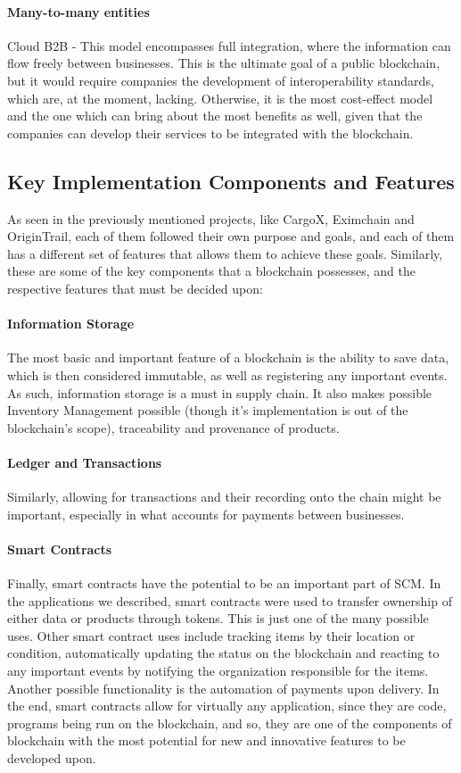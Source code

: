 \paragraph{Many-to-many entities} Cloud B2B - This model encompasses full integration, where the information can flow freely between businesses. This is the ultimate goal of a public blockchain, but it would require companies the development of interoperability standards, which are, at the moment, lacking. Otherwise, it is the most cost-effect model and the one which can bring about the most benefits as well, given that the companies can develop their services to be integrated with the blockchain.

\subsection{Key Implementation Components and Features}
As seen in the previously mentioned projects, like CargoX, Eximchain and OriginTrail, each of them followed their own purpose and goals, and each of them has a different set of features that allows them to achieve these goals. Similarly, these are some of the key components that a blockchain possesses, and the respective features that must be decided upon:

\paragraph{Information Storage}
The most basic and important feature of a blockchain is the ability to save data, which is then considered immutable, as well as registering any important events. As such, information storage is a must in supply chain. It also makes possible Inventory Management possible (though it's implementation is out of the blockchain's scope), traceability and provenance of products.
      
\paragraph{Ledger and Transactions}
Similarly, allowing for transactions and their recording onto the chain might be important, especially in what accounts for payments between businesses.
  
\paragraph{Smart Contracts}
Finally, smart contracts have the potential to be an important part of SCM. In the applications we described, smart contracts were used to transfer ownership of either data or products through tokens. This is just one of the many possible uses. Other smart contract uses include tracking items by their location or condition, automatically updating the status on the blockchain and reacting to any important events by notifying the organization responsible for the items. Another possible functionality is the automation of payments upon delivery. In the end, smart contracts allow for virtually any application, since they are code, programs being run on the blockchain, and so, they are one of the components of blockchain with the most potential for new and innovative features to be developed upon.
        
